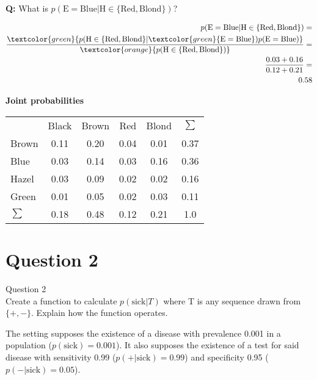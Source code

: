 \documentclass[usenames,dvipsnames,table]{beamer}
\newcommand{\cgy}{\cellcolor{gray!25}}
\newcommand{\cgr}{\cellcolor{green!25}}
\newcommand{\cye}{\cellcolor{orange!25}}
\begin{document}
\begin{frame}

\textbf{Q:} What is $p(\mathrm{E}=\mathrm{Blue}|\mathrm{H} \in \{\mathrm{Red}, \mathrm{Blond}\})$?

\begin{align*}
p(\mathrm{E}=\mathrm{Blue}|\mathrm{H}\in\{\mathrm{Red},\mathrm{Blond}\})
=\\ \frac{\textcolor{green}{p(\mathrm{H}\in\{\mathrm{Red},\mathrm{Blond}\}
                             |\textcolor{green}{\mathrm{E}=\mathrm{Blue}})
                             p(\mathrm{E}=\mathrm{Blue})}}
       {\textcolor{orange}{p(\mathrm{H}\in\{\mathrm{Red}, \mathrm{Blond}\})}}
=\\ \frac{0.03+0.16}{0.12+0.21}
=\\ 0.58
\end{align*}

\textbf{Joint probabilities}
\begin{table}
\begin{tabular}{lccccc}
           & Black & Brown & Red  & Blond & $\sum$ \\
     Brown &\cgy0.11&\cgy0.20&\cye0.04&\cye0.01& 0.37 \\
      Blue &\cgy0.03&\cgy0.14&\cgr0.03&\cgr0.16& 0.36 \\
     Hazel &\cgy0.03&\cgy0.09&\cye0.02&\cye0.02& 0.16 \\
     Green &\cgy0.01&\cgy0.05&\cye0.02&\cye0.03& 0.11 \\
    $\sum$ &  0.18 &  0.48 & 0.12 &  0.21 & 1.0   \\
\end{tabular}
\end{table}
\end{frame}

\section{Question 2}
\begin{frame}
\begin{center}
{\huge{Question 2}}
\\\vspace{2em}
Create a function to calculate $p(\mathrm{sick}|T)$ where T is any sequence drawn from $\{+, -\}$. Explain how the function operates.
\end{center}
\end{frame}

\begin{frame}
The setting supposes the existence of a disease with prevalence 0.001 in a population ($p(\mathrm{sick})=0.001$). It also supposes the existence of a test for said disease with sensitivity 0.99 ($p(+|\mathrm{sick})=0.99$) and specificity 0.95 ($p(-|\mathrm{sick})=0.05$).

\begin{align}
\end{align}
\end{frame}
\end{document}
